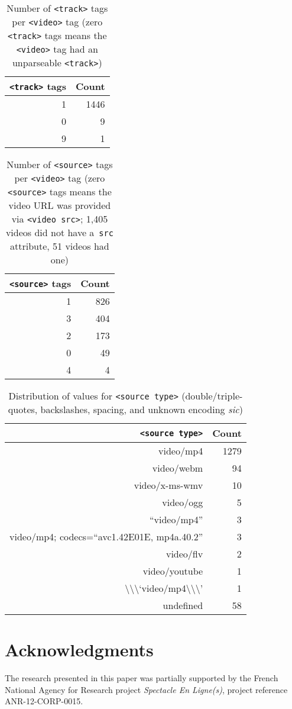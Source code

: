\documentclass{sig-alternate}
\begin{document}
\begin{table}[p]
  \centering
  \begin{tabular}{ r | r }                       
    \texttt{<track>} tags & Count \\
    \hline
    1 & 1446\\
    0 & 9\\
    9 & 1\\
  \end{tabular}
  \caption{Number of \texttt{<track>} tags per
    \texttt{<video>} tag \tiny (zero \texttt{<track>}
    tags means  the \texttt{<video>} tag had
    an  unparseable \texttt{<track>})}
  \label{table:track}    
\end{table}

\begin{table}[p]
  \centering
  \begin{tabular}{ r | r }
    \texttt{<source>} tags & Count \\
    \hline
    1 & 826\\    
    3 & 404\\    
    2 & 173\\    
    0 & 49\\
    4 & 4\\
  \end{tabular}
  \caption{Number of \texttt{<source>} tags per
    \texttt{<video>} tag \tiny (zero \texttt{<source>}
    tags means the video URL was provided via
    \texttt{<video src>}; 1,405 videos did not have
    a~\texttt{src} attribute, 51 videos had one)}
  \label{table:source}    
\end{table}

\begin{table}[p]
  \centering
  \begin{tabular}{ r | r }
    \texttt{<source type>} & Count \\
    \hline
    video/mp4 & 1279\\
    video/webm & 94\\
    video/x-ms-wmv & 10\\    
    video/ogg & 5\\    
    ``video/mp4'' & 3\\    
    video/mp4; codecs=``avc1.42E01E, mp4a.40.2'' & 3\\
    video/flv & 2\\
    video/youtube & 1\\    
    \textbackslash\textbackslash\textbackslash`video/mp4\textbackslash\textbackslash\textbackslash' & 1\\
    undefined & 58\\  
  \end{tabular}
  \caption{Distribution of values for
    \texttt{<source type>}  \tiny
    (double/triple-quotes,
    backslashes, spacing, and unknown encoding
    \emph{sic})}
  \label{table:type}    
\end{table}

\section*{Acknowledgments}
\footnotesize
The research presented in this paper was partially supported
by the French National Agency for Research  project
\emph{Spectacle En Ligne(s)}, project reference
\mbox{ANR-12-CORP-0015}.

\normalsize


\end{document}
